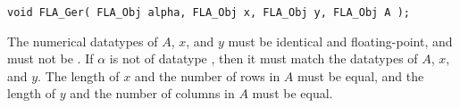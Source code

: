 \begin{flaspec}
\begin{verbatim}
void FLA_Ger( FLA_Obj alpha, FLA_Obj x, FLA_Obj y, FLA_Obj A ); 
\end{verbatim}
\begin{checks}
\checkitem
The numerical datatypes of $ A $, $ x $, and $ y $ must be identical and
floating-point, and must not be \flaconstantns.
\itemvsp
\checkitem
If $ \alpha $ is not of datatype \flaconstantns, then it must
match the datatypes of $ A $, $ x $, and $ y $.
\itemvsp
\checkitem
The length of $ x $ and the number of rows in $ A $ must be equal, and the
length of $ y $ and the number of columns in $ A $ must be equal.
\end{checks}
\begin{params}
\end{params}
\end{flaspec}


